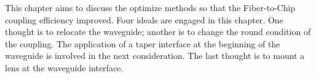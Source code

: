 This chapter aims to discuss the optimize methods so that the Fiber-to-Chip coupling efficiency improved. Four ideals are engaged in this chapter. One thought is to relocate the waveguide; another is to change the round condition of the coupling. The application of a taper interface at the beginning of the waveguide is involved in the next consideration. The last thought is to mount a lens at the waveguide interface.
